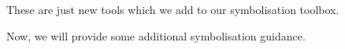 		
		These are just new tools which we add to our symbolisation toolbox. 
		
		Now, we will provide some additional  symbolisation guidance.


	
%		
%	

